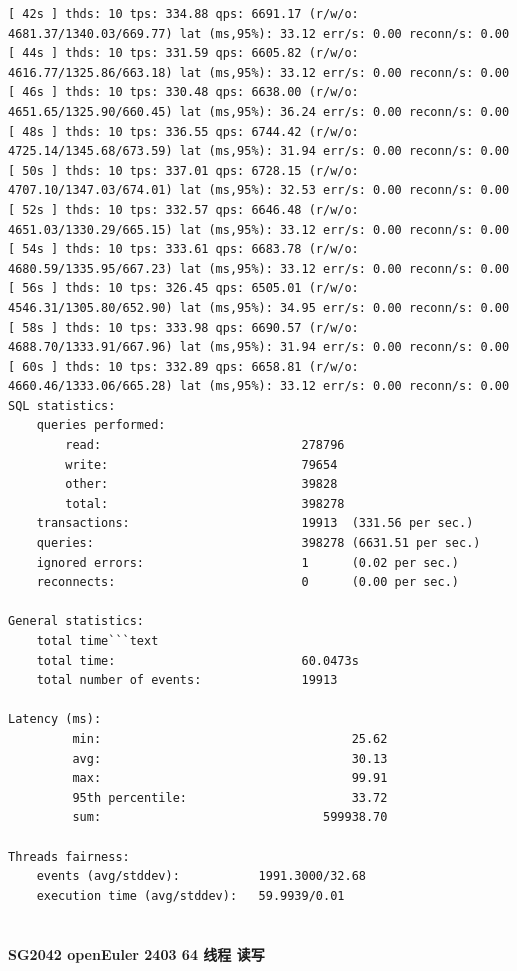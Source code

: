 \documentclass{article}
\begin{document}
\begin{verbatim}
[ 42s ] thds: 10 tps: 334.88 qps: 6691.17 (r/w/o: 4681.37/1340.03/669.77) lat (ms,95%): 33.12 err/s: 0.00 reconn/s: 0.00
[ 44s ] thds: 10 tps: 331.59 qps: 6605.82 (r/w/o: 4616.77/1325.86/663.18) lat (ms,95%): 33.12 err/s: 0.00 reconn/s: 0.00
[ 46s ] thds: 10 tps: 330.48 qps: 6638.00 (r/w/o: 4651.65/1325.90/660.45) lat (ms,95%): 36.24 err/s: 0.00 reconn/s: 0.00
[ 48s ] thds: 10 tps: 336.55 qps: 6744.42 (r/w/o: 4725.14/1345.68/673.59) lat (ms,95%): 31.94 err/s: 0.00 reconn/s: 0.00
[ 50s ] thds: 10 tps: 337.01 qps: 6728.15 (r/w/o: 4707.10/1347.03/674.01) lat (ms,95%): 32.53 err/s: 0.00 reconn/s: 0.00
[ 52s ] thds: 10 tps: 332.57 qps: 6646.48 (r/w/o: 4651.03/1330.29/665.15) lat (ms,95%): 33.12 err/s: 0.00 reconn/s: 0.00
[ 54s ] thds: 10 tps: 333.61 qps: 6683.78 (r/w/o: 4680.59/1335.95/667.23) lat (ms,95%): 33.12 err/s: 0.00 reconn/s: 0.00
[ 56s ] thds: 10 tps: 326.45 qps: 6505.01 (r/w/o: 4546.31/1305.80/652.90) lat (ms,95%): 34.95 err/s: 0.00 reconn/s: 0.00
[ 58s ] thds: 10 tps: 333.98 qps: 6690.57 (r/w/o: 4688.70/1333.91/667.96) lat (ms,95%): 31.94 err/s: 0.00 reconn/s: 0.00
[ 60s ] thds: 10 tps: 332.89 qps: 6658.81 (r/w/o: 4660.46/1333.06/665.28) lat (ms,95%): 33.12 err/s: 0.00 reconn/s: 0.00
SQL statistics:
    queries performed:
        read:                            278796
        write:                           79654
        other:                           39828
        total:                           398278
    transactions:                        19913  (331.56 per sec.)
    queries:                             398278 (6631.51 per sec.)
    ignored errors:                      1      (0.02 per sec.)
    reconnects:                          0      (0.00 per sec.)

General statistics:
    total time```text
    total time:                          60.0473s
    total number of events:              19913

Latency (ms):
         min:                                   25.62
         avg:                                   30.13
         max:                                   99.91
         95th percentile:                       33.72
         sum:                               599938.70

Threads fairness:
    events (avg/stddev):           1991.3000/32.68
    execution time (avg/stddev):   59.9939/0.01
    
\end{verbatim}

\paragraph{SG2042 openEuler 2403 64 线程 读写}
\end{document}
